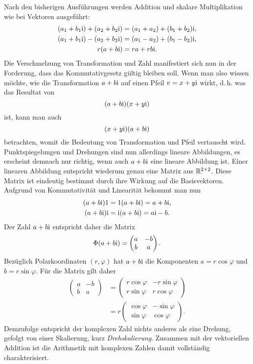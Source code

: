 Nach den bisherigen Ausführungen werden Addition und skalare
Multiplikation wie bei Vektoren ausgeführt:
\begin{gather*}
(a_1+b_1\mathrm{i}) + (a_2+b_2\mathrm{i}) = (a_1+a_2)+(b_1+b_2)\mathrm{i},\\
(a_1+b_1\mathrm{i}) - (a_2+b_2\mathrm{i}) = (a_1-a_2)+(b_1-b_2)\mathrm{i},\\
r(a+b\mathrm{i}) = ra+rb\mathrm{i}.
\end{gather*}
Die Verschmelzung von Transformation und Zahl manifestiert sich nun
in der Forderung, dass das Kommutativgesetz gültig bleiben soll.
Wenn man also wissen möchte, wie die Transformation
$a+b\mathrm{i}$ auf einen Pfeil $v=x+y\mathrm{i}$ wirkt, d.\,h. was das Resultat
von
\[(a+b\mathrm{i})(x+y\mathrm{i})\]
ist, kann man auch
\[(x+y\mathrm{i})(a+b\mathrm{i})\]
betrachten, womit die Bedeutung von Transformation und Pfeil
vertauscht wird. Punktspiegelungen und Drehungen sind nun
allerdings lineare Abbildungen, es erscheint demnach nur richtig,
wenn auch $a+b\mathrm{i}$ eine lineare Abbildung ist. Einer linearen
Abbildung entspricht wiederum genau eine Matrix aus $\mathbb R^{2\times 2}$.
Diese Matrix ist eindeutig bestimmt durch ihre Wirkung auf die
Basisvektoren. Aufgrund von Kommutativität und Linearität bekommt
man nun
\begin{gather*}
(a+b\mathrm{i})1 = 1(a+b\mathrm{i}) = a+b\mathrm{i},\\
(a+b\mathrm{i})\mathrm{i} = \mathrm{i}(a+b\mathrm{i}) = a\mathrm{i}-b.
\end{gather*}
Der Zahl $a+b\mathrm{i}$ entspricht daher die Matrix
\[\Phi(a+b\mathrm{i}) = \begin{pmatrix}a & -b\\ b & a\end{pmatrix}.\]
Bezüglich Polarkoordinaten $(r,\varphi)$ hat $a+b\mathrm{i}$
die Komponenten $a=r\cos\varphi$ und $b=r\sin\varphi$.
Für die Matrix gilt daher%
\begin{align*}
\begin{pmatrix}a & -b\\ b & a\end{pmatrix}
&= \begin{pmatrix}
r\cos\varphi & -r\sin\varphi\\
r\sin\varphi & r\cos\varphi
\end{pmatrix}\\
&= r\begin{pmatrix}
\cos\varphi & -\sin\varphi\\
\sin\varphi & \cos\varphi
\end{pmatrix}.
\end{align*}
Demzufolge entspricht der komplexen Zahl nichts anderes als eine
Drehung, gefolgt von einer Skalierung, kurz \emph{Drehskalierung}.
Zusammen mit der vektoriellen Addition ist die Arithmetik mit komplexen
Zahlen damit vollständig charakterisiert.

